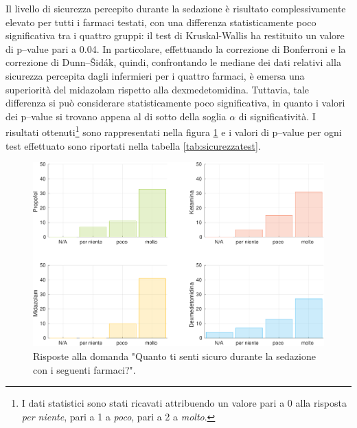 Il livello di sicurezza percepito durante la sedazione è risultato complessivamente elevato per tutti i farmaci testati, con una differenza statisticamente poco significativa tra i quattro gruppi: il test di Kruskal-Wallis ha restituito un valore di p--value pari a 0.04. In particolare, effettuando la correzione di Bonferroni e la correzione di Dunn--Šidák, quindi, confrontando le mediane dei dati relativi alla sicurezza percepita dagli infermieri per i quattro farmaci, è emersa una superiorità del midazolam rispetto alla dexmedetomidina. Tuttavia, tale differenza si può considerare statisticamente poco significativa, in quanto i valori dei p--value si trovano appena al di sotto della soglia $\alpha$ di significatività. I risultati ottenuti\footnote{I dati statistici sono stati ricavati attribuendo un valore pari a 0 alla risposta \emph{per niente}, pari a 1 a \emph{poco}, pari a 2 a \emph{molto}.} sono rappresentati nella figura \ref{fig:sicurezza1} e i valori di p--value per ogni test effettuato sono riportati nella tabella \ref{tab:sicurezzatest}.

\vfill

\begin{figure}[!h]
    \centering
    \includegraphics[width=1\textwidth]{Figure/sicurezza-istogrammi.pdf}
    \caption{Risposte alla domanda "Quanto ti senti sicuro durante la sedazione con i seguenti farmaci?".} %
    \label{fig:sicurezza1}
\end{figure}

\vfill

\newpage

